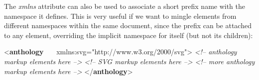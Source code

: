 The {\itshape xmlns} attribute can also be used to associate a short prefix name with the namespace it defines. This is very useful if we want to mingle elements from different namespaces within the same document, since the prefix can be attached to any element, overriding the implicit namespace for itself (but not its children): \par\bgroup\exampleFont \begin{shaded}\noindent\mbox{}{<\textbf{anthology}\mbox{}\newline 
   xmlns:svg="http://www.w3.org/2000/svg">}\mbox{}\newline 
\hspace*{1em}\mbox{}\newline 
\textit{<!-- anthology markup elements here -->}\mbox{}\newline 
{}\mbox{}\newline 
\textit{<!-- SVG markup elements here -->}\mbox{}\newline 
{}\mbox{}\newline 
\textit{<!-- more anthology markup elements here -->}\mbox{}\newline 
{</\textbf{anthology}>}\end{shaded}\egroup\par \par
